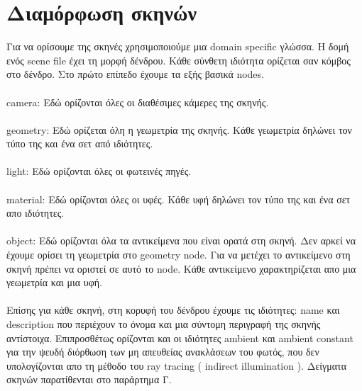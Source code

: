 \begin{sloppypar}
\section{Διαμόρφωση σκηνών}
	Για να ορίσουμε της σκηνές χρησιμοποιούμε μια domain specific γλώσσα. Η δομή ενός scene file έχει τη μορφή δένδρου.
Κάθε σύνθετη ιδιότητα ορίζεται σαν κόμβος στο δένδρο. Στο πρώτο επίπεδο έχουμε τα εξής βασικά nodes.

\paragraph{}
camera: Εδώ ορίζονται όλες οι διαθέσιμες κάμερες της σκηνής.
\paragraph{}
geometry: Εδώ ορίζεται όλη η γεωμετρία της σκηνής. Κάθε γεωμετρία δηλώνει τον τύπο της και ένα σετ από ιδιότητες.
\paragraph{}
light: Εδώ ορίζονται όλες οι φωτεινές πηγές.
\paragraph{}
material: Εδώ ορίζονται όλες οι υφές. Κάθε υφή δηλώνει τον τύπο της και ένα σετ απο ιδιότητες.
\paragraph{}
object: Εδώ ορίζονται όλα τα αντικείμενα που είναι ορατά στη σκηνή. Δεν αρκεί να έχουμε ορίσει τη γεωμετρία στο geometry
node. Για να μετέχει το αντικείμενο στη σκηνή πρέπει να οριστεί σε αυτό το node. Κάθε αντικείμενο χαρακτηρίζεται απο μια γεωμετρία και
μια υφή.

\paragraph{}
Eπίσης για κάθε σκηνή, στη κορυφή του δένδρου έχουμε τις ιδιότητες: name και description που περιέχουν το όνομα και μια σύντομη 
περιγραφή της σκηνής αντίστοιχα. Επιπροσθέτως ορίζονται και οι ιδιότητες ambient και ambient constant για την ψευδή διόρθωση των
μη απευθείας ανακλάσεων του φωτός, που δεν υπολογίζονται απο τη μέθοδο του ray tracing ( indirect illumination ). Δείγματα σκηνών
παρατίθενται στο παράρτημα Γ.

\end{sloppypar}

